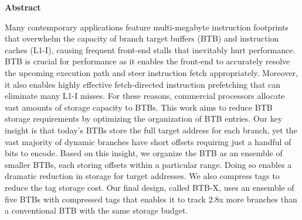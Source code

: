 \documentclass[../../../main.tex]{subfiles}
\begin{document}
\begin{center}
  \textbf{Abstract}
  \end{center}
\begin{changemargin}{0.75cm}{0.75cm}
Many contemporary applications feature multi-megabyte instruction footprints that overwhelm the capacity of branch target buffers (BTB) and instruction caches (L1-I), causing frequent front-end stalls that inevitably hurt performance. BTB is crucial for performance as it enables the front-end to accurately resolve the upcoming execution path and steer instruction fetch appropriately. Moreover, it also enables highly effective fetch-directed instruction prefetching that can eliminate many L1-I misses. For these reasons, commercial processors allocate vast amounts of storage capacity to BTBs. This work aims to reduce BTB storage requirements by optimizing the organization of BTB entries. Our key insight is that today's BTBs store the full target address for each branch, yet the vast majority of dynamic branches have short offsets requiring just a handful of bits to encode. Based on this insight, we organize the BTB as an ensemble of smaller BTBs, each storing offsets within a particular range. Doing so enables a dramatic reduction in storage for target addresses. We also compress tags to reduce the tag storage cost. Our final design, called BTB-X, uses an ensemble of five BTBs with compressed tags that enables it to track 2.8x more branches than a conventional BTB with the same storage budget.
 \end{changemargin}

\vspace{1cm}

\begin{refsection}
  
  \printbibliography[heading=refs]
\end{refsection}
\FloatBarrier
\end{document}
